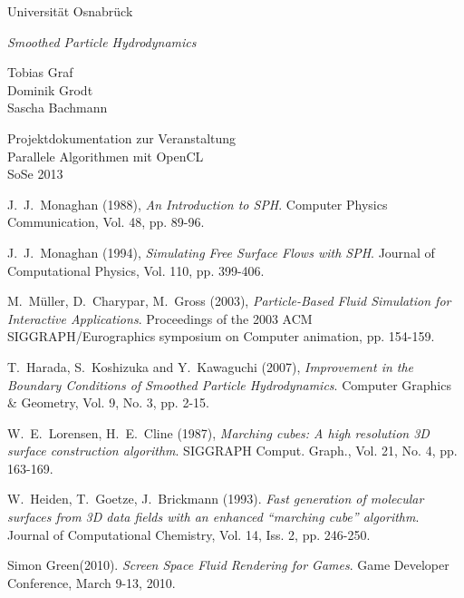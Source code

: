 \documentclass[a4paper,12pt,oneside]{amsbook}
\begin{document}
\begin{titlepage}
\begin{center}
{\large Universität Osnabrück}


\vspace{9em}
{\LARGE \emph{Smoothed Particle Hydrodynamics}}

\vspace{2em}
{\large Tobias Graf\\ Dominik Grodt\\ Sascha Bachmann}

\vspace{9em}
{\large Projektdokumentation zur Veranstaltung\\ Parallele Algorithmen mit OpenCL\\ SoSe 2013}



\end{center}
\end{titlepage}

\tableofcontents










\begin{thebibliography}{}


J.\ J.\ Monaghan (1988),
{\em An Introduction to SPH}. Computer Physics Communication, Vol. 48, pp. 89-96.


J.\ J.\ Monaghan (1994),
{\em Simulating Free Surface Flows with SPH}. Journal of Computational Physics, Vol. 110, pp. 399-406.


M.\ Müller, D.\ Charypar, M.\ Gross (2003),
{\em Particle-Based Fluid Simulation for Interactive Applications}. Proceedings of the 2003 ACM SIGGRAPH/Eurographics symposium on Computer animation, pp. 154-159.


T.\ Harada, S.\ Koshizuka and Y.\ Kawaguchi (2007),
{\em Improvement in the Boundary Conditions of Smoothed Particle Hydrodynamics}. Computer Graphics \& Geometry, Vol. 9, No. 3, pp. 2-15.


W.\ E.\ Lorensen, H.\ E.\ Cline (1987),
{\em Marching cubes: A high resolution 3D surface construction algorithm}. SIGGRAPH Comput. Graph., Vol. 21, No. 4, pp. 163-169.


W.\ Heiden, T.\ Goetze, J.\ Brickmann (1993). {\em Fast generation of molecular surfaces from 3D data fields with an enhanced ``marching cube'' algorithm}. Journal of Computational Chemistry, Vol. 14, Iss. 2, pp. 246-250.


Simon Green(2010). {\em Screen Space Fluid Rendering for Games}. Game Developer Conference, March 9-13, 2010.

\end{thebibliography}
\end{document}
